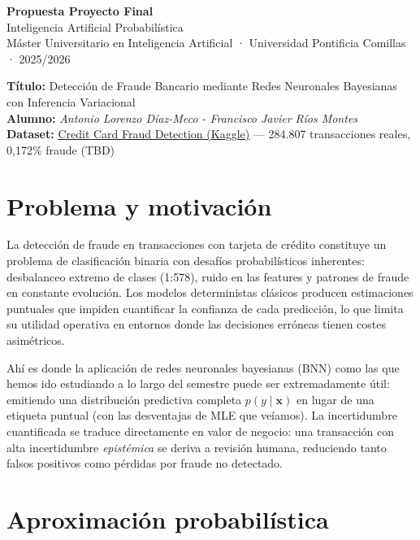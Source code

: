 \documentclass[11pt, a4paper]{article}
\begin{document}
\begin{center}
    {\Large \textbf{Propuesta Proyecto Final}}\\[4pt]
    {\normalsize Inteligencia Artificial Probabilística}\\[2pt]
    {\small Máster Universitario en Inteligencia Artificial · Universidad Pontificia Comillas · 2025/2026}
\end{center}

\vspace{0.3cm}
\begin{mdframed}[backgroundcolor=lightgray, linecolor=accentblue, linewidth=1pt, innertopmargin=6pt, innerbottommargin=6pt]
    \textbf{Título:} Detección de Fraude Bancario mediante Redes Neuronales Bayesianas con Inferencia Variacional\\[3pt]
    \textbf{Alumno:} \textit{Antonio Lorenzo Díaz-Meco - Francisco Javier Ríos Montes}\\[3pt]
    \textbf{Dataset:} \href{https://www.kaggle.com/datasets/mlg-ulb/creditcardfraud}{Credit Card Fraud Detection (Kaggle)} — 284.807 transacciones reales, 0,172\% fraude (TBD)
\end{mdframed}

\section{Problema y motivación}

La detección de fraude en transacciones con tarjeta de crédito constituye un problema de clasificación binaria con desafíos probabilísticos inherentes: desbalanceo extremo de clases (1:578), ruido en las features y patrones de fraude en constante evolución. Los modelos deterministas clásicos producen estimaciones puntuales que impiden cuantificar la confianza de cada predicción, lo que limita su utilidad operativa en entornos donde las decisiones erróneas tienen costes asimétricos.

Ahí es donde la aplicación de redes neuronales bayesianas (BNN) como las que hemos ido estudiando a lo largo del semestre puede ser extremadamente útil: emitiendo una distribución predictiva completa $p(y \mid \mathbf{x})$ en lugar de una etiqueta puntual (con las desventajas de MLE que veíamos). La incertidumbre cuantificada se traduce directamente en valor de negocio: una transacción con alta incertidumbre \textit{epistémica} se deriva a revisión humana, reduciendo tanto falsos positivos como pérdidas por fraude no detectado.

\section{Aproximación probabilística}
\end{document}
